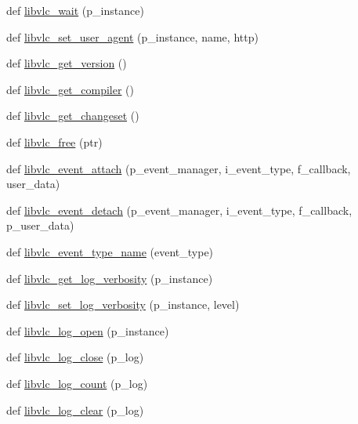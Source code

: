 \begin{DoxyCompactItemize}
\item 
def \hyperlink{namespacesrc_1_1lib_1_1vlc_a691f46cb28de62ac97e0a6a257b6915f}{libvlc\+\_\+wait} (p\+\_\+instance)
\item 
def \hyperlink{namespacesrc_1_1lib_1_1vlc_a7b54c9c7feb19e1f2bcfdd60672ceb13}{libvlc\+\_\+set\+\_\+user\+\_\+agent} (p\+\_\+instance, name, http)
\item 
def \hyperlink{namespacesrc_1_1lib_1_1vlc_ab4176219742f1aaf96977ac13b37bf58}{libvlc\+\_\+get\+\_\+version} ()
\item 
def \hyperlink{namespacesrc_1_1lib_1_1vlc_a1f695a699a3dfd3d21bd26f50f509d00}{libvlc\+\_\+get\+\_\+compiler} ()
\item 
def \hyperlink{namespacesrc_1_1lib_1_1vlc_a625fc5e2aec47cb22bf1fc1495799272}{libvlc\+\_\+get\+\_\+changeset} ()
\item 
def \hyperlink{namespacesrc_1_1lib_1_1vlc_a51bf696a504b39c31b3c21c4ca28842d}{libvlc\+\_\+free} (ptr)
\item 
def \hyperlink{namespacesrc_1_1lib_1_1vlc_ac161c4753d53c6a2e23b33a433141839}{libvlc\+\_\+event\+\_\+attach} (p\+\_\+event\+\_\+manager, i\+\_\+event\+\_\+type, f\+\_\+callback, user\+\_\+data)
\item 
def \hyperlink{namespacesrc_1_1lib_1_1vlc_a2ca1615eb5cfe8198d1bfc291dca51fc}{libvlc\+\_\+event\+\_\+detach} (p\+\_\+event\+\_\+manager, i\+\_\+event\+\_\+type, f\+\_\+callback, p\+\_\+user\+\_\+data)
\item 
def \hyperlink{namespacesrc_1_1lib_1_1vlc_acb1b6c09acc215f9ae56ceee3e763f34}{libvlc\+\_\+event\+\_\+type\+\_\+name} (event\+\_\+type)
\item 
def \hyperlink{namespacesrc_1_1lib_1_1vlc_ac0a0d5634f95cf0081a3253ea4a995f6}{libvlc\+\_\+get\+\_\+log\+\_\+verbosity} (p\+\_\+instance)
\item 
def \hyperlink{namespacesrc_1_1lib_1_1vlc_a7efbd02af7cc987cd50b8ea4a053f8d0}{libvlc\+\_\+set\+\_\+log\+\_\+verbosity} (p\+\_\+instance, level)
\item 
def \hyperlink{namespacesrc_1_1lib_1_1vlc_a29f69ab36ff4917c47ee889d7c49e35d}{libvlc\+\_\+log\+\_\+open} (p\+\_\+instance)
\item 
def \hyperlink{namespacesrc_1_1lib_1_1vlc_aa153d1b5b7da7604c38b06827e0750e5}{libvlc\+\_\+log\+\_\+close} (p\+\_\+log)
\item 
def \hyperlink{namespacesrc_1_1lib_1_1vlc_afe63035c062713468e9a0f8b9c3cc805}{libvlc\+\_\+log\+\_\+count} (p\+\_\+log)
\item 
def \hyperlink{namespacesrc_1_1lib_1_1vlc_adb2364d094aa8c28738be41cfedaea22}{libvlc\+\_\+log\+\_\+clear} (p\+\_\+log)

\end{DoxyCompactItemize}
